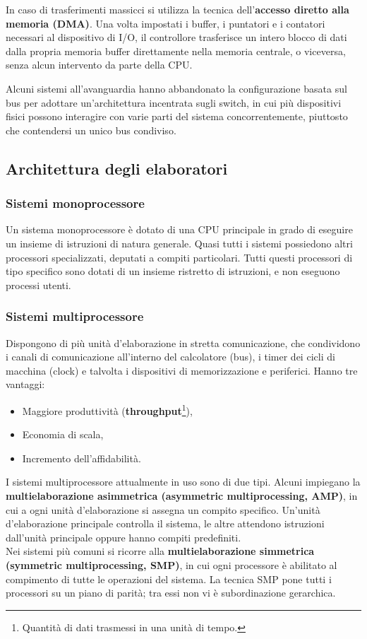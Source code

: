 \documentclass[11pt,a4paper]{article}
\begin{document}
In caso di trasferimenti massicci si utilizza
la tecnica dell'\textbf{accesso diretto alla memoria (DMA)}. Una volta impostati i buffer, i puntato­ri e i contatori necessari al dispositivo di I/O, il controllore trasferisce un intero blocco di da­ti dalla propria memoria buffer direttamente nella memoria centrale, o viceversa, senza al­cun intervento da parte della CPU.

Alcuni sistemi all'avanguardia hanno abbandonato la configurazione basata sul bus
per adottare un'architettura incentrata sugli switch, in cui più dispositivi fisici possono inte­ragire con varie parti del sistema concorrentemente, piuttosto che contendersi un unico bus
condiviso.

\subsection{Architettura degli elaboratori}
\subsubsection{Sistemi monoprocessore}
Un sistema monoprocessore è dotato di una CPU prin­cipale in grado di eseguire un insieme di istruzioni di natura generale. Quasi tutti i sistemi possiedono altri processori specializ­zati, deputati a compiti particolari. Tutti questi processori di tipo specifico sono dotati di un insieme ristretto di istruzio­ni, e non eseguono processi utenti.

\subsubsection{Sistemi multiprocessore}
Dispongono di più unità d'ela­borazione in stretta comunicazione, che condividono i canali di comunicazione all'interno
del calcolatore (bus), i timer dei cicli di macchina (clock) e talvolta i dispositivi di memoriz­zazione e periferici. Hanno tre vantaggi:
\begin{itemize}[noitemsep, leftmargin=*]
  \item Maggiore produttività (\textbf{throughput}\footnote{Quantità di dati trasmessi in una unità di tempo.}),
  \item Economia di scala,
  \item Incremento dell'affidabilità.
\end{itemize}
%
I sistemi multiprocessore attualmente in uso sono di due tipi. Alcuni impiegano la
\textbf{multielaborazione asimmetrica (asymmetric multiprocessing, AMP)}, in cui a ogni unità d'ela­borazione si assegna un compito specifico. Un'unità d'elaborazione principale controlla il si­stema, le altre attendono istruzioni dall'unità principale oppure hanno compiti predefiniti.\\
Nei sistemi più comuni si ricorre alla \textbf{multielaborazione simmetrica (symmetric multiprocessing, SMP)}, in cui ogni processore è abilitato al compimento di tutte le operazioni del
sistema. La tecnica SMP pone tutti i processori su un piano di parità; tra essi non vi è subor­dinazione gerarchica.
\end{document}

